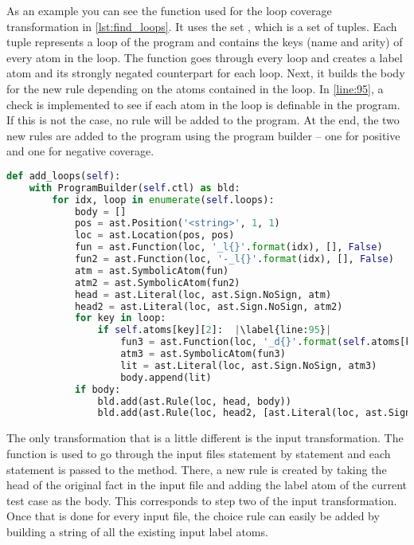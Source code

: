 As an example you can see the function used for the loop coverage transformation in \cref{lst:find_loops}. It uses the set , which is a set of tuples. Each tuple represents a loop of the program and contains the keys (name and arity) of every atom in the loop. The function goes through every loop and creates a label atom and its strongly negated counterpart for each loop. Next, it builds the body for the new rule depending on the atoms contained in the loop. In \cref{line:95}, a check is implemented to see if each atom in the loop is definable in the program. If this is not the case, no rule will be added to the program. At the end, the two new rules are added to the program using the program builder -- one for positive and one for negative coverage.

\begin{lstlisting}[float, caption={Function implementing the loop coverage transformation (taken from CoverageCheck.py)},label=lst:find_loops, language=Python, firstnumber=82, escapechar=|]
def add_loops(self):
    with ProgramBuilder(self.ctl) as bld:
        for idx, loop in enumerate(self.loops):
            body = []
            pos = ast.Position('<string>', 1, 1)
            loc = ast.Location(pos, pos)
            fun = ast.Function(loc, '_l{}'.format(idx), [], False)
            fun2 = ast.Function(loc, '-_l{}'.format(idx), [], False)
            atm = ast.SymbolicAtom(fun)
            atm2 = ast.SymbolicAtom(fun2)
            head = ast.Literal(loc, ast.Sign.NoSign, atm)
            head2 = ast.Literal(loc, ast.Sign.NoSign, atm2)
            for key in loop:
                if self.atoms[key][2]:  |\label{line:95}|
                    fun3 = ast.Function(loc, '_d{}'.format(self.atoms[key][0][0]), [], False)
                    atm3 = ast.SymbolicAtom(fun3)
                    lit = ast.Literal(loc, ast.Sign.NoSign, atm3)
                    body.append(lit)
            if body:
                bld.add(ast.Rule(loc, head, body))
                bld.add(ast.Rule(loc, head2, [ast.Literal(loc, ast.Sign.Negation, atm)]))
\end{lstlisting}

The only transformation that is a little different is the input transformation. The  function is used to go through the input files statement by statement and each statement is passed to the  method. There, a new rule is created by taking the head of the original fact in the input file and adding the label atom of the current test case as the body. This corresponds to step two of the input transformation. Once that is done for every input file, the choice rule can easily be added by building a string of all the existing input label atoms.


